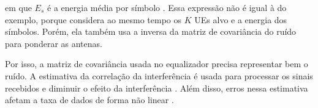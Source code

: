 em que $E_s$ é a energia média por símbolo \cite{zhao-lmmse}. Essa expressão não é igual à do exemplo, porque considera ao mesmo tempo os $K$ UEs alvo e a energia dos símbolos. Porém, ela também usa a inversa da matriz de covariância do ruído para ponderar as antenas.

Por isso, a matriz de covariância usada no equalizador precisa representar bem o ruído. A estimativa da correlação da interferência é usada para processar os sinais recebidos e diminuir o efeito da interferência \cite{tomasin-interference}. Além disso, erros nessa estimativa afetam a taxa de dados de forma não linear \cite{tomasin-interference}.
